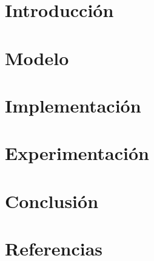 \documentclass[a4paper]{article}
\begin{document}
\tableofcontents

\newpage
\section{Introducción}


\newpage
\section{Modelo}


\newpage
\section{Implementación}\label{Implementacion}


\newpage
\section{Experimentación}


\newpage
\section{Conclusión}
%

\newpage

\section{Referencias}
\begingroup
\renewcommand{\section}[2]{}

\endgroup

\newpage
\section{Enunciado}
%

\newpage
\appendix
%
\end{document}
